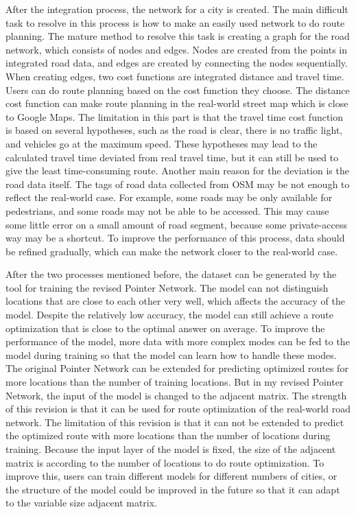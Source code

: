 \documentclass[final-report]{report-template}
\begin{document}
After the integration process, the network for a city is created.
The main difficult task to resolve in this process is how to make an easily used network to do route planning.
The mature method to resolve this task is creating a graph for the road network, which consists of nodes and edges.
Nodes are created from the points in integrated road data, and edges are created by connecting the nodes sequentially.
When creating edges, two cost functions are integrated distance and travel time. 
Users can do route planning based on the cost function they choose. 
The distance cost function can make route planning in the real-world street map which is close to Google Maps.
The limitation in this part is that the travel time cost function is based on several hypotheses, 
such as the road is clear, there is no traffic light, and vehicles go at the maximum speed. 
These hypotheses may lead to the calculated travel time deviated from real travel time, 
but it can still be used to give the least time-consuming route.
Another main reason for the deviation is the road data itself. 
The tags of road data collected from OSM may be not enough to reflect the real-world case.
For example, some roads may be only available for pedestrians, and some roads may not be able to be accessed.
This may cause some little error on a small amount of road segment, because some private-access way may be a shortcut.
To improve the performance of this process, data should be refined gradually, which can make the network closer to the real-world case.

After the two processes mentioned before, the dataset can be generated by the tool for training the revised Pointer Network.
The model can not distinguish locations that are close to each other very well, which affects the accuracy of the model.
Despite the relatively low accuracy, the model can still achieve a route optimization that is close to the optimal answer on average.
To improve the performance of the model, 
more data with more complex modes can be fed to the model during training so that the model can learn how to handle these modes.
The original Pointer Network can be extended for predicting optimized routes for more locations than the number of training locations.
But in my revised Pointer Network, the input of the model is changed to the adjacent matrix. 
The strength of this revision is that it can be used for route optimization of the real-world road network.
The limitation of this revision is that it can not be extended to predict the optimized route with more locations than the number of locations during training.
Because the input layer of the model is fixed, the size of the adjacent matrix is according to the number of locations to do route optimization.
To improve this, users can train different models for different numbers of cities, 
or the structure of the model could be improved in the future so that it can adapt to the variable size adjacent matrix.
\end{document}

